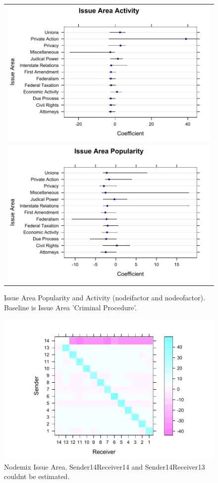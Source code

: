 \documentclass[headsepline=true, abstracton]{scrartcl}
\begin{document}
 




 \begin{figure}[H]
  \begin{tabular}{c}
\includegraphics[width = 1\textwidth, trim= 0.1cm 1cm 0.1cm .1cm,clip=true]{issuearea_activity}
 \\
\includegraphics[width = 1\textwidth, trim= 0.1cm 1cm 0.1cm .1cm,clip=true]{issuearea_popularity}
\end{tabular}
\caption{Issue Area Popularity and Activity (nodeifactor and nodeofactor). Baseline is Issue Area 'Criminal Procedure'.}
\end{figure} 


 \begin{figure}[H]
\includegraphics[width=15cm]{heatplot_issue_area}
\caption{Nodemix Issue Area. Sender14Receiver14 and Sender14Receiver13 couldnt be estimated.}
 \label{number_supporting}
\vspace{-.25cm}
\end{figure} 
\end{document}
